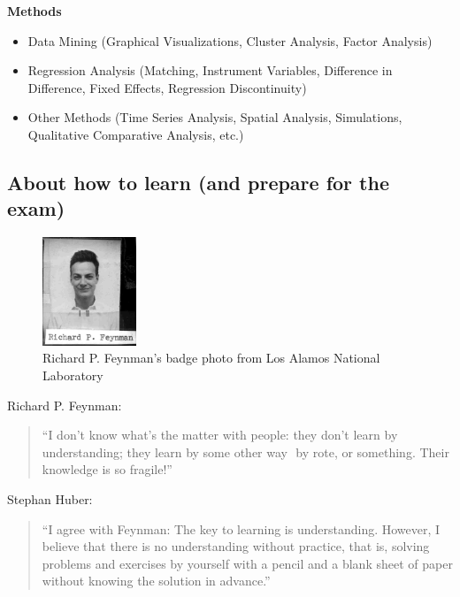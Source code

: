 \documentclass[
  12pt,
  oneside]{book}
\providecommand{\tightlist}{%
  \setlength{\itemsep}{0pt}\setlength{\parskip}{0pt}}
\theoremstyle{definition}
\theoremstyle{definition}
\theoremstyle{definition}
\theoremstyle{definition}
\theoremstyle{remark}
\begin{document}
\textbf{Methods}

\begin{itemize}
\tightlist
\item
  Data Mining (Graphical Visualizations, Cluster Analysis, Factor Analysis)
\item
  Regression Analysis (Matching, Instrument Variables, Difference in Difference, Fixed Effects, Regression Discontinuity)
\item
  Other Methods (Time Series Analysis, Spatial Analysis, Simulations, Qualitative Comparative Analysis, etc.)
\end{itemize}

\hypertarget{about-how-to-learn-and-prepare-for-the-exam}{%
\subsection*{About how to learn (and prepare for the exam)}\label{about-how-to-learn-and-prepare-for-the-exam}}

\begin{figure}
\centering
\includegraphics[width=0.25\textwidth,height=\textheight]{fig/Richard-Feynman.jpg}
\caption[\label{fig:feynman} Richard P. Feynman's badge photo from Los Alamos National Laboratory]{\label{fig:feynman} Richard P. Feynman's badge photo from Los Alamos National Laboratory\footnotemark{}}
\end{figure}

Richard P. Feynman:

\begin{quote}
``I don't know what's the matter with people: they don't learn by understanding; they learn by some other way ­ by rote, or something. Their knowledge is so fragile!''
\end{quote}

Stephan Huber:

\begin{quote}
``I agree with Feynman: The key to learning is understanding. However, I believe that there is no understanding without practice, that is, solving problems and exercises by yourself with a pencil and a blank sheet of paper without knowing the solution in advance.''
\end{quote}
\end{document}
